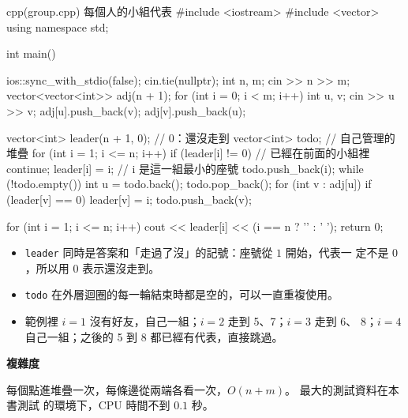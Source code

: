 \begin{example}[label=ex:group]{cpp}{(group.cpp) 每個人的小組代表}
#include <iostream>
#include <vector>
using namespace std;

int main() {
    ios::sync_with_stdio(false);
    cin.tie(nullptr);
    int n, m;
    cin >> n >> m;
    vector<vector<int>> adj(n + 1);
    for (int i = 0; i < m; i++) {
        int u, v;
        cin >> u >> v;
        adj[u].push_back(v);
        adj[v].push_back(u);
    }

    vector<int> leader(n + 1, 0);            // 0：還沒走到
    vector<int> todo;                        // 自己管理的堆疊
    for (int i = 1; i <= n; i++) {
        if (leader[i] != 0) {                // 已經在前面的小組裡
            continue;
        }
        leader[i] = i;                       // i 是這一組最小的座號
        todo.push_back(i);
        while (!todo.empty()) {
            int u = todo.back();
            todo.pop_back();
            for (int v : adj[u]) {
                if (leader[v] == 0) {
                    leader[v] = i;
                    todo.push_back(v);
                }
            }
        }
    }

    for (int i = 1; i <= n; i++) {
        cout << leader[i] << (i == n ? '\n' : ' ');
    }
    return 0;
}
\end{example}


\begin{itemize}
\item \texttt{leader} 同時是答案和「走過了沒」的記號：座號從 $1$ 開始，代表一
定不是 $0$，所以用 $0$ 表示還沒走到。
\item \texttt{todo} 在外層迴圈的每一輪結束時都是空的，可以一直重複使用。
\item 範例裡 $i = 1$ 沒有好友，自己一組；$i = 2$ 走到 5、7；$i = 3$ 走到 6、
8；$i = 4$ 自己一組；之後的 5 到 8 都已經有代表，直接跳過。
\end{itemize}

\textbf{複雜度}

每個點進堆疊一次，每條邊從兩端各看一次，$O(n + m)$。 最大的測試資料在本書測試
的環境下，CPU 時間不到 $0.1$ 秒。

